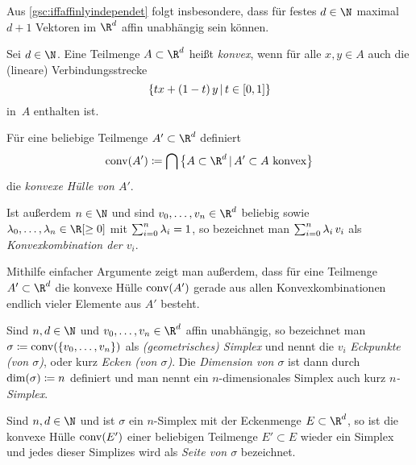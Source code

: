 
Aus \cref{gsc:iffaffinlyindependet} folgt insbesondere, dass für festes $d\in\N$
maximal $d+1$ Vektoren im $\R^d$ affin unabhängig sein können.

\begin{thDef}
    Sei $d\in\N$. Eine Teilmenge $A\subset\R^d$ heißt \emph{konvex}, wenn
    für alle $x,y\in A$ auch die (lineare) Verbindungsstrecke
    \[ \{ tx + (1-t)\,y \Mid t\in[0,1] \} \]
    in~$A$ enthalten ist.

    \newpage
    \noindent
    Für eine beliebige Teilmenge $A'\subset\R^d$ definiert
    \[ \conv(A') \defeq 
        \bigcap \,\bigl\{ A\subset\R^d \Mid A'\subset A\text{ konvex} \bigr\}
    \]
    die \emph{konvexe Hülle von $A'$}.
    
    \noindent
    Ist außerdem $n\in\N$ und sind $v_0,\ldots,v_n\in\R^d$ beliebig sowie
    $\lambda_0,\ldots,\lambda_n\in\R[\geq0]$ mit $\sum_{i=0}^n\lambda_i = 1$, so
    bezeichnet man $\sum_{i=0}^n \lambda_i\,v_i$ als \emph{Konvexkombination der
    $v_i$}.
\end{thDef}

\begin{thBemerkung} \label{gsc:convexhullviaconvexcombinations}
    Mithilfe einfacher Argumente zeigt man außerdem, dass für eine Teilmenge
    $A'\subset\R^d$ die konvexe Hülle $\operatorname{conv}(A')$ gerade aus allen 
    Konvexkombinationen endlich vieler Elemente aus $A'$ besteht.
\end{thBemerkung}


\begin{thDef}
    \label{gsc:def:simplex}
    Sind $n,d\in\N$ und $v_0,\ldots,v_n\in\R^d$ affin unabhängig, so bezeichnet
    man $\sigma \coloneqq \operatorname{conv}(\{v_0,\ldots,v_n\})$ als \emph{(geometrisches)
    Simplex} und nennt die $v_i$ \emph{Eckpunkte (von $\sigma$)}, oder kurz
    \emph{Ecken (von $\sigma$)}. Die \emph{Dimension von $\sigma$} ist dann
    durch $\dim(\sigma) \coloneqq n$ definiert und man nennt ein $n$-dimensionales
    Simplex auch kurz \emph{$n$-Simplex}.
\end{thDef}

\begin{thDef}
    Sind $n,d\in\N$ und ist $\sigma$ ein $n$-Simplex mit der Eckenmenge
    $E \subset\R^d$, so ist die konvexe Hülle $\operatorname{conv}(E')$ einer beliebigen 
    Teilmenge $E'\subset E$ wieder ein Simplex und jedes dieser Simplizes wird
    als \emph{Seite von $\sigma$} bezeichnet.
\end{thDef}

